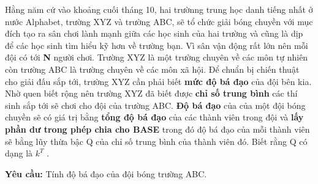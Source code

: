 Hằng năm cứ vào khoảng cuối tháng 10, hai trườnng trung học danh tiếng nhất ở nước Alphabet, trường XYZ và trường ABC, sẽ tổ chức giải bóng chuyền với mục đích tạo ra sân chơi lành mạnh giữa các học sinh của hai trường và cũng là dịp để các học sinh tìm hiểu kỹ hơn về trường bạn. Vì sân vận động rất lớn nên mỗi đội có tới    \textbf{     N    }    người chơi. Trường XYZ là một trường chuyên về các môn tự nhiên còn trường ABC là trường chuyên về các môn xã hội. Để chuẩn bị chiến thuật cho giải đấu sắp tới, trường XYZ cần phải biết    \textbf{     mức độ bá đạo    }    của đội bên kia. Nhờ quen biết rộng nên trường XYZ đã biết được    \textbf{     chỉ số trung bình    }    các thí sinh sắp tới sẽ chơi cho đội của trường ABC.    \textbf{     Độ bá đạo    }    của của một đội bóng chuyền sẽ có giá trị bằng    \textbf{     tổng độ bá đạo    }    của các thành viên trong đội và    \textbf{     lấy phần dư trong phép chia cho BASE    }    trong đó độ bá đạo của mỗi thành viên sẽ bằng lũy thừa bậc Q của chỉ số trung bình của thành viên đó. Biết rằng Q có dạng là    \textbf{     $k^{T}$}    .   



\textbf{     Yêu cầu:    }    Tính độ bá đạo của đội bóng trường ABC.